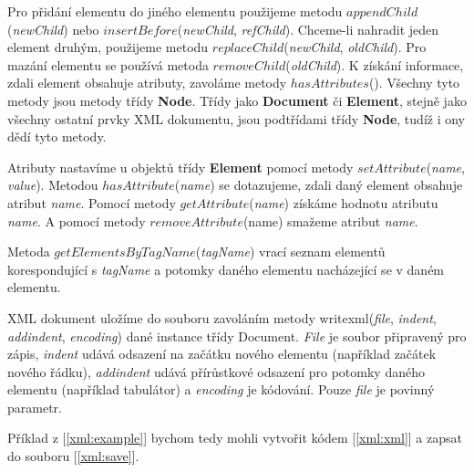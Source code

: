 Pro přidání elementu do jiného elementu použijeme metodu
$appendChild$(\textit{newChild}) nebo
$insertBefore$(\textit{newChild}, \textit{refChild}). Chceme-li
nahradit jeden element druhým, použijeme metodu
$replaceChild$(\textit{newChild}, \textit{oldChild}). Pro mazání
elementu se používá metoda $removeChild$(\textit{oldChild}). K získání
informace, zdali element obsahuje atributy, zavoláme metody
$hasAttributes$(). Všechny tyto metody jsou metody
třídy \textbf{Node}. Třídy jako \textbf{Document} či \textbf{Element},
stejně jako všechny ostatní prvky XML dokumentu, jsou podtřídami
třídy \textbf{Node}, tudíž i ony dědí tyto metody.

Atributy nastavíme u objektů třídy \textbf{Element} pomocí metody
$setAttribute$(\textit{name}, \textit{value}). Metodou
$hasAttribute$(\textit{name}) se dotazujeme, zdali daný element
obsahuje atribut \textit{name}. Pomocí metody
$getAttribute$(\textit{name}) získáme hodnotu
atributu \textit{name}. A pomocí metody $removeAttribute$(name)
smažeme atribut \textit{name}.

Metoda $getElementsByTagName$(\textit{tagName}) vrací seznam elementů
korespondující s \textit{tagName} a potomky daného elementu
nacházející se v daném elementu.

XML dokument uložíme do souboru zavoláním metody
writexml(\textit{file}, \textit{indent}, \textit{addindent}, \textit{encoding})
dané instance třídy Document. \textit{File} je soubor připravený pro
zápis, \textit{indent} udává odsazení na začátku nového elementu
(například začátek nového řádku), \textit{addindent} udává přírůstkové
odsazení pro potomky daného elementu (například tabulátor)
a \textit{encoding} je kódování. Pouze \textit{file} je povinný
parametr.

Příklad z [\autoref{xml:example}] bychom tedy mohli vytvořit kódem
[\autoref{xml:xml}] a zapsat do souboru
[\autoref{xml:save}].\\

